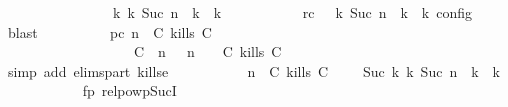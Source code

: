 \begin{isabellebody}
\ \ \ \ \ \ \ \ \ \ \ \ \ \ \ \ {\isasymhookrightarrow}\isactrlbsup k\isactrlesup \ {\isacharparenleft}{\isasymGamma}\isactrlsub k{\isacharcomma}\ Suc\ n\ {\isasymturnstile}\ {\isasymPsi}\isactrlsub k\ {\isasymtriangleright}\ {\isasymPhi}\isactrlsub k{\isacharparenright}{\isacharparenright}{\isacartoucheclose}\isanewline
\ \ \ \ \ \ \ \ \ \ \ rc{\isacharcolon}{\isacartoucheopen}{\isasymrho}\ {\isasymin}\ {\isasymlbrakk}\ {\isasymGamma}\isactrlsub k{\isacharcomma}\ Suc\ n\ {\isasymturnstile}\ {\isasymPsi}\isactrlsub k\ {\isasymtriangleright}\ {\isasymPhi}\isactrlsub k\ {\isasymrbrakk}\isactrlsub c\isactrlsub o\isactrlsub n\isactrlsub f\isactrlsub i\isactrlsub g{\isacartoucheclose}\ \isamarkupfalse%
\ blast\isanewline
\ \ \ \ \ \ \ \ \isamarkupfalse%
\ pc{\isacharcolon}{\isacartoucheopen}{\isacharparenleft}{\isasymGamma}{\isacharcomma}\ n\ {\isasymturnstile}\ {\isacharparenleft}C\ kills\ C\ {\isacharhash}\ {\isasymPsi}\ {\isasymtriangleright}\ {\isasymPhi}{\isacharparenright}\isanewline
\ \ \ \ \ \ \ \ \ \ \ \ \ \ \ \ \ \ {\isasymhookrightarrow}\ {\isacharparenleft}{\isacharparenleft}{\isacharparenleft}C\ {\isasymnot}{\isasymUp}\ n{\isacharparenright}\ {\isacharhash}\ {\isasymGamma}{\isacharparenright}{\isacharcomma}\ n\ {\isasymturnstile}\ {\isasymPsi}\ {\isasymtriangleright}\ {\isacharparenleft}{\isacharparenleft}C\ kills\ C\ {\isacharhash}\ {\isasymPhi}{\isacharparenright}{\isacharparenright}{\isacartoucheclose}\isanewline
\ \ \ \ \ \ \ \ \ \ \isamarkupfalse%
\ {\isacharparenleft}simp\ add{\isacharcolon}\ elims{\isacharunderscore}part\ kills{\isacharunderscore}e{}{\isacharparenright}\isanewline
\ \ \ \ \ \ \ \ \isamarkupfalse%
\ {\isacartoucheopen}{\isacharparenleft}{\isasymGamma}{\isacharcomma}\ n\ {\isasymturnstile}\ {\isacharparenleft}C\ kills\ C\ {\isacharhash}\ {\isasymPsi}\ {\isasymtriangleright}\ {\isasymPhi}{\isacharparenright}\ {\isasymhookrightarrow}\isactrlbsup Suc\ k\isactrlesup \ {\isacharparenleft}{\isasymGamma}\isactrlsub k{\isacharcomma}\ Suc\ n\ {\isasymturnstile}\ {\isasymPsi}\isactrlsub k\ {\isasymtriangleright}\ {\isasymPhi}\isactrlsub k{\isacharparenright}{\isacartoucheclose}\isanewline
\ \ \ \ \ \ \ \ \ \ \isamarkupfalse%
\ fp\ relpowp{\isacharunderscore}Suc{\isacharunderscore}I{}\ \isamarkupfalse%

\end{isabellebody}
